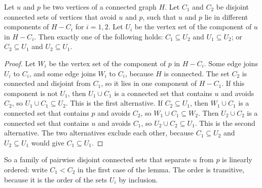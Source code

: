 \begin{lemma}\label{lem:nested}
Let $u$ and $p$ be two vertices of a connected graph $H$. Let $C_1$ and $C_2$ be disjoint connected
sets of vertices that avoid $u$ and $p$, such that $u$ and $p$ lie in different components of
$H-C_i$ for $i=1,2$. Let $U_i$ be the vertex set of the component of $u$ in $H-C_i$. Then exactly
one of the following holds: $C_1\subseteq U_2$ and $U_1\subseteq U_2$; or $C_2\subseteq U_1$ and
$U_2\subseteq U_1$.
\end{lemma}

\begin{proof}
Let $W_i$ be the vertex set of the component of $p$ in $H-C_i$. Some edge joins $U_i$ to $C_i$,
and some edge joins $W_i$ to $C_i$, because $H$ is connected. The set $C_2$ is connected and
disjoint from $C_1$, so it lies in one component of $H-C_1$. If this component is not $U_1$, then
$U_1\cup C_1$ is a connected set that contains $u$ and avoids $C_2$, so $U_1\cup C_1\subseteq U_2$.
This is the first alternative. If $C_2\subseteq U_1$, then $W_1\cup C_1$ is a connected set that
contains $p$ and avoids $C_2$, so $W_1\cup C_1\subseteq W_2$. Then $U_2\cup C_2$ is a connected
set that contains $u$ and avoids $C_1$, so $U_2\cup C_2\subseteq U_1$. This is the second
alternative. The two alternatives exclude each other, because
$C_1\subseteq U_2$ and $U_2\subseteq U_1$ would give $C_1\subseteq U_1$.
\end{proof}

So a family of pairwise disjoint connected sets that separate $u$ from $p$ is linearly ordered:
write $C_1<C_2$ in the first case of the lemma. The order is transitive, because it is the order
of the sets $U_i$ by inclusion.

